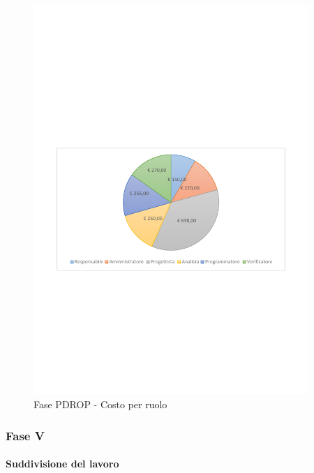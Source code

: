 \documentclass[../PianoProgetto.tex]{subfiles}
\begin{document}
	\begin{figure}[!h]
		\centering
		\includegraphics[width=0.93\textwidth , trim=2cm 9.5cm 2cm 11cm]{grafici/PDROP/PDROP-costo}
			\caption{Fase PDROP - Costo per ruolo}
		\label{fig:CircleChart-fasePDROP_costo}
	\end{figure}
\vfill	
\newpage
	
	\subsubsection{Fase V}
				\paragraph{Suddivisione del lavoro}
					
\end{document}
